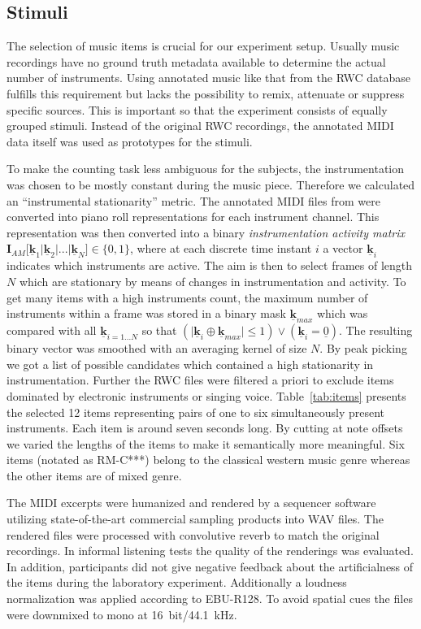 \subsection{Stimuli}

The selection of music items is crucial for our experiment setup. Usually music recordings have no ground truth metadata available to determine the actual number of instruments. Using annotated music like that from the RWC database~\cite{rwc} fulfills this requirement but lacks the possibility to remix, attenuate or suppress specific sources. This is important so that the experiment consists of equally grouped stimuli. Instead of the original RWC recordings, the annotated MIDI data itself was used as prototypes for the stimuli.

To make the counting task less ambiguous for the subjects, the instrumentation was chosen to be mostly constant during the music piece. 
Therefore we calculated an ``instrumental stationarity'' metric. 
The annotated MIDI files from \cite{rwc} were converted into piano roll representations for each instrument channel. This representation was then converted into a binary \emph{instrumentation activity matrix} $\mathbf{I}_{AM}\lbrack \mathbf{\underline{k}}_1 \vert \mathbf{\underline{k}}_2 \vert  ... \vert \mathbf{\underline{k}}_N \rbrack \in \{0,1\}$, where at each discrete time instant $i$ a vector $\mathbf{\underline{k}}_i$ indicates which instruments are active. The aim is then to select frames of length $N$ which are stationary by means of changes in instrumentation and activity. To get many items with a high instruments count, the maximum number of instruments within a frame was stored in a binary mask $\mathbf{\underline{k}}_{max}$ which was compared with all $\mathbf{\underline{k}}_{i=1...N}$ so that $(\vert\mathbf{\underline{k}}_{i} \oplus \mathbf{\underline{k}}_{max}\vert \leq 1) \lor (\mathbf{\underline{k}}_{i} = \underline{0})$. The resulting binary vector was smoothed with an averaging kernel of size $N$. By peak picking we got a list of possible candidates which contained a high stationarity in instrumentation.
Further the RWC files were filtered a priori to exclude items dominated by electronic instruments or singing voice. Table~\ref{tab:items} presents the selected 12 items representing pairs of one to six simultaneously present instruments. Each item is around seven seconds long. By cutting at note offsets we varied the lengths of the items to make it semantically more meaningful. Six items (notated as RM-C***) belong to the classical western music genre whereas the other items are of mixed genre.
\par
The MIDI excerpts were humanized and rendered by a sequencer software utilizing state-of-the-art commercial sampling products into WAV files. The rendered files were processed with convolutive reverb to match the original recordings. In informal listening tests the quality of the renderings was evaluated. In addition, participants did not give negative feedback about the artificialness of the items during the laboratory experiment. Additionally a loudness normalization was applied according to EBU-R128\cite{EBU2011}. To avoid spatial cues the files were downmixed to mono at 16~bit/44.1~kHz.

